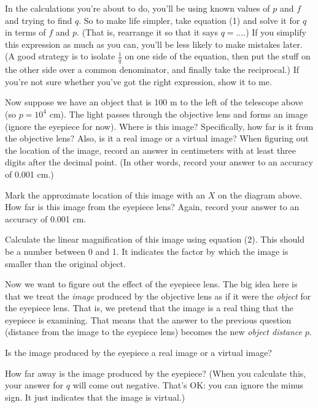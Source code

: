 In the calculations you're about to do, you'll be using known values of $p$ 
and $f$ and trying to find $q$.  So to make life simpler, take equation
(1) and solve it for $q$ in terms of $f$ and $p$.  (That is, rearrange
it so that it says $q=\ldots$.)  If you simplify this expression
as much as you can, you'll be less likely to make mistakes later.
(A good strategy is to isolate ${\frac{1} q}$ on one side of the equation,
then put the stuff on the other side over a common denominator, and
finally take the reciprocal.)  If you're not sure whether you've
got the right expression, show it to me.

\answerspace{2in}

Now suppose we have an object that is 100 m to the left of the telescope
above (so $p= 10^4$ cm).  The light passes through the objective lens
and forms an image (ignore the eyepiece for now).  Where is this
image?  Specifically, how far is it from the objective lens?  Also,
is it a real image or a virtual image?  When figuring out the
location of the image, record an answer in centimeters with at least
three digits after the decimal point.  (In other words, record
your answer to an accuracy of 0.001 cm.)

\answerspace{1in}

Mark the approximate location of this image with an $X$ on the diagram
above.
How far is this image from the eyepiece lens?  Again, record your answer
to an accuracy of 0.001 cm.

\answerspace{1in}

Calculate the linear magnification of this image using equation (2).
This should be a number between 0 and 1.  It indicates the factor
by which the image is smaller than the original object.

\answerspace{1in}


Now we want to figure out the effect of the eyepiece lens.  The big
idea here is that we treat the {\it image} produced by the objective
lens as if it were the {\it object} for the eyepiece lens.  That is,
we pretend that the image is a real thing that the eyepiece is examining.
That means that the answer to the previous question (distance
from the image to the eyepiece lens) becomes the new {\it object distance}
$p$.

Is the image produced by the eyepiece a real image or a virtual image?

\answerspace{1in}

How far away is the image produced by the eyepiece?
(When you calculate this, your answer for $q$ will come out negative.
That's OK: you can ignore the minus sign.  It just indicates that
the image is virtual.)

